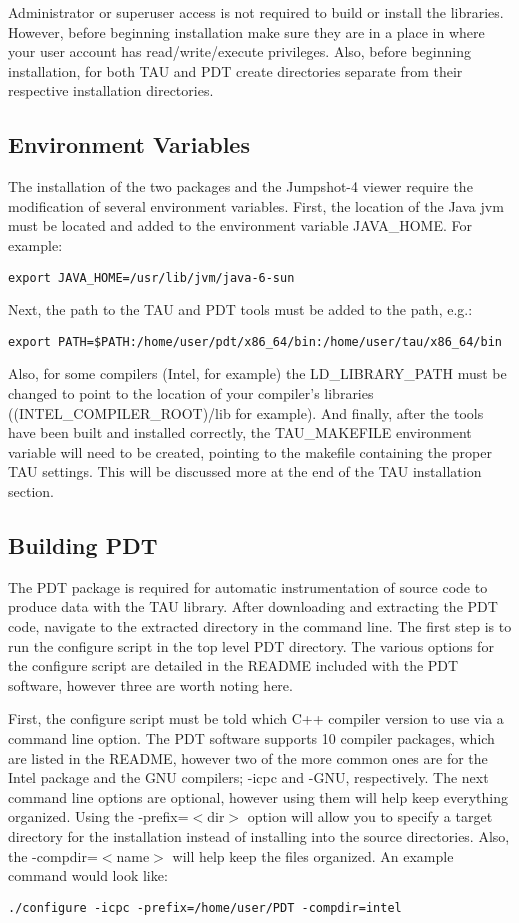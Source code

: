 \documentclass[11pt,letterpaper]{article}
\begin{document}
Administrator or superuser access is not required to build or install the libraries. However, before beginning installation make sure they are in a place in where your user account has read/write/execute privileges. Also, before beginning installation, for both TAU and PDT create directories separate from their respective installation directories.

\subsection{Environment Variables}
The installation of the two packages and the Jumpshot-4 viewer require the modification of several environment variables. First, the location of the Java jvm must be located and added to the environment variable JAVA\_HOME. For example:
\begin{cmd_line}
\texttt{export JAVA\_HOME=/usr/lib/jvm/java-6-sun}
\end{cmd_line}

Next, the path to the TAU and PDT tools must be added to the path, e.g.:
\begin{cmd_line}
\texttt{export PATH=\$PATH:/home/user/pdt/x86\_64/bin:/home/user/tau/x86\_64/bin}
\end{cmd_line}

Also, for some compilers (Intel, for example) the LD\_LIBRARY\_PATH must be changed to point to the location of your compiler's libraries ((INTEL\_COMPILER\_ROOT)/lib for example). And finally, after the tools have been built and installed correctly, the TAU\_MAKEFILE environment variable will need to be created, pointing to the makefile containing the proper TAU settings. This will be discussed more at the end of the TAU installation section.

\subsection{Building PDT}
The PDT package is required for automatic instrumentation of source code to produce data with the TAU library. After downloading and extracting the PDT code, navigate to the extracted directory in the command line. The first step is to run the configure script in the top level PDT directory. The various options for the configure script are detailed in the README included with the PDT software, however three are worth noting here.

First, the configure script must be told which C++ compiler version to use via a command line option. The PDT software supports 10 compiler packages, which are listed in the README, however two of the more common ones are for the Intel package and the GNU compilers; -icpc and -GNU, respectively. The next command line options are optional, however using them will help keep everything organized. Using the -prefix=$<$dir$>$ option will allow you to specify a target directory for the installation instead of installing into the source directories. Also, the -compdir=$<$name$>$ will help keep the files organized.
An example command would look like:
\begin{cmd_line}
\texttt{./configure -icpc -prefix=/home/user/PDT -compdir=intel}
\end{cmd_line}
\end{document}
